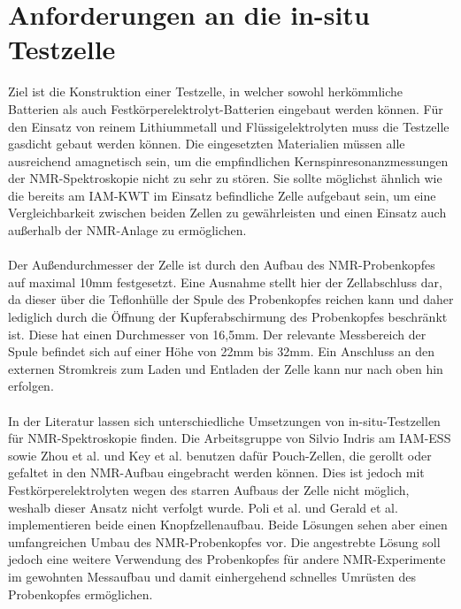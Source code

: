 \documentclass[a4paper, 11pt, headsepline,footsepline,twoside,abstract]{scrbook}
\begin{document}
\section{Anforderungen an die in-situ Testzelle}
Ziel ist die Konstruktion einer Testzelle, in welcher sowohl herkömmliche Batterien als auch Festkörperelektrolyt-Batterien eingebaut werden können. Für den Einsatz von reinem Lithium\-metall und Flüssigelektrolyten muss die Testzelle gasdicht gebaut werden können. Die eingesetzten Materialien müssen alle ausreichend amagnetisch sein, um die empfindlichen Kernspinresonanzmessungen der NMR-Spektroskopie nicht zu sehr zu stören. Sie sollte möglichst ähnlich wie die bereits am IAM-KWT im Einsatz befindliche Zelle aufgebaut sein, um eine Vergleichbarkeit zwischen beiden Zellen zu gewährleisten und einen Einsatz auch außerhalb der NMR-Anlage zu ermöglichen. 
\\\\
Der Außendurchmesser der Zelle ist durch den Aufbau des NMR-Probenkopfes auf maximal 10mm festgesetzt. Eine Ausnahme stellt hier der Zellabschluss dar, da dieser über die Teflonhülle der Spule des Probenkopfes reichen kann und daher lediglich durch die Öffnung der Kupferabschirmung des Probenkopfes beschränkt ist. Diese hat einen Durchmesser von 16,5mm. Der relevante Messbereich der Spule befindet sich auf einer Höhe von 22mm bis 32mm. Ein Anschluss an den externen Stromkreis zum Laden und Entladen der Zelle kann nur nach oben hin erfolgen.
\\\\
In der Literatur lassen sich unterschiedliche Umsetzungen von in-situ-Testzellen für NMR-Spektroskopie finden. Die Arbeitsgruppe von Silvio Indris am IAM-ESS sowie Zhou et al. \cite{zhou2013paramagnetic} und Key et al. \cite{key2009real} benutzen dafür Pouch-Zellen, die gerollt oder gefaltet in den NMR-Aufbau eingebracht werden können. Dies ist jedoch mit Festkörperelektrolyten wegen des starren Aufbaus der Zelle nicht möglich, weshalb dieser Ansatz nicht verfolgt wurde.  Poli et al. \cite{poli2011new} und Gerald et al. \cite{gerald2001situ} implementieren beide einen Knopfzellenaufbau. Beide Lösungen sehen aber einen umfangreichen Umbau des NMR-Probenkopfes vor. Die angestrebte Lösung soll jedoch eine weitere Verwendung des Probenkopfes für andere NMR-Experimente im gewohnten Messaufbau und damit einhergehend schnelles Umrüsten des Probenkopfes ermöglichen.
\end{document}
